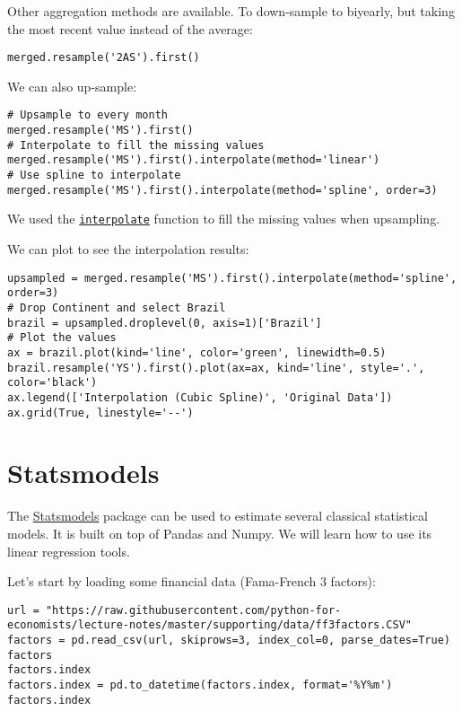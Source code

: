 \documentclass[12pt, a4paper]{article}
\begin{document}
Other aggregation methods are available.
To down-sample to biyearly, but taking the most recent value instead of the average:
\lstset{language=jupyter-python,label= ,caption= ,captionpos=b,numbers=none}
\begin{lstlisting}
merged.resample('2AS').first()
\end{lstlisting}

We can also up-sample:
\lstset{language=jupyter-python,label= ,caption= ,captionpos=b,numbers=none}
\begin{lstlisting}
# Upsample to every month
merged.resample('MS').first()
# Interpolate to fill the missing values
merged.resample('MS').first().interpolate(method='linear')
# Use spline to interpolate
merged.resample('MS').first().interpolate(method='spline', order=3)
\end{lstlisting}
We used the \href{https://pandas.pydata.org/pandas-docs/stable/reference/api/pandas.Series.interpolate.html}{\texttt{interpolate}} function to fill the missing values when upsampling.

We can plot to see the interpolation results:
\lstset{language=jupyter-python,label= ,caption= ,captionpos=b,numbers=none}
\begin{lstlisting}
upsampled = merged.resample('MS').first().interpolate(method='spline', order=3)
# Drop Continent and select Brazil
brazil = upsampled.droplevel(0, axis=1)['Brazil']
# Plot the values
ax = brazil.plot(kind='line', color='green', linewidth=0.5)
brazil.resample('YS').first().plot(ax=ax, kind='line', style='.', color='black')
ax.legend(['Interpolation (Cubic Spline)', 'Original Data'])
ax.grid(True, linestyle='--')
\end{lstlisting}

\section{Statsmodels}
\label{sec:org28e4ce6}
The \href{https://www.statsmodels.org/stable/index.html}{Statsmodels} package can be used to estimate several classical statistical models.
It is built on top of Pandas and Numpy.
We will learn how to use its linear regression tools.

Let's start by loading some financial data (Fama-French 3 factors):
\lstset{language=jupyter-python,label= ,caption= ,captionpos=b,numbers=none}
\begin{lstlisting}
url = "https://raw.githubusercontent.com/python-for-economists/lecture-notes/master/supporting/data/ff3factors.CSV"
factors = pd.read_csv(url, skiprows=3, index_col=0, parse_dates=True)
factors
factors.index
factors.index = pd.to_datetime(factors.index, format='%Y%m')
factors.index
\end{lstlisting}
\end{document}
